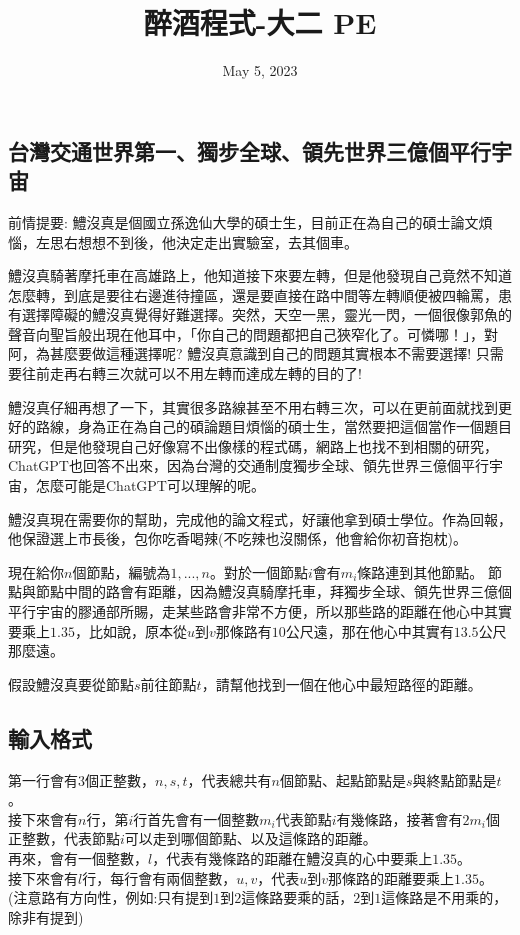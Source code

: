 \documentclass{article}
\title{醉酒程式-大二 PE}
\date{May 5, 2023}
\begin{document}
\begin{CJK*}{UTF8}{bsmi}

\maketitle

\section*{台灣交通世界第一、獨步全球、領先世界三億個平行宇宙}

前情提要: 鱧沒真是個國立孫逸仙大學的碩士生，目前正在為自己的碩士論文煩惱，左思右想想不到後，他決定走出實驗室，去其個車。

鱧沒真騎著摩托車在高雄路上，他知道接下來要左轉，但是他發現自己竟然不知道怎麼轉，到底是要往右邊進待撞區，還是要直接在路中間等左轉順便被四輪罵，患有選擇障礙的鱧沒真覺得好難選擇。突然，天空一黑，靈光一閃，一個很像郭魚的聲音向聖旨般出現在他耳中，「你自己的問題都把自己狹窄化了。可憐哪！」，對阿，為甚麼要做這種選擇呢? 鱧沒真意識到自己的問題其實根本不需要選擇! 只需要往前走再右轉三次就可以不用左轉而達成左轉的目的了!

鱧沒真仔細再想了一下，其實很多路線甚至不用右轉三次，可以在更前面就找到更好的路線，身為正在為自己的碩論題目煩惱的碩士生，當然要把這個當作一個題目研究，但是他發現自己好像寫不出像樣的程式碼，網路上也找不到相關的研究，ChatGPT也回答不出來，因為台灣的交通制度獨步全球、領先世界三億個平行宇宙，怎麼可能是ChatGPT可以理解的呢。

鱧沒真現在需要你的幫助，完成他的論文程式，好讓他拿到碩士學位。作為回報，他保證選上市長後，包你吃香喝辣(不吃辣也沒關係，他會給你初音抱枕)。

現在給你$n$個節點，編號為$1,...,n$。對於一個節點$i$會有$m_i$條路連到其他節點。
節點與節點中間的路會有距離，因為鱧沒真騎摩托車，拜獨步全球、領先世界三億個平行宇宙的膠通部所賜，走某些路會非常不方便，所以那些路的距離在他心中其實要乘上$1.35$，比如說，原本從$u$到$v$那條路有$10$公尺遠，那在他心中其實有$13.5$公尺那麼遠。

假設鱧沒真要從節點$s$前往節點$t$，請幫他找到一個在他心中最短路徑的距離。

\subsection*{輸入格式}
第一行會有$3$個正整數，$n,s,t$，代表總共有$n$個節點、起點節點是$s$與終點節點是$t$。\\
接下來會有$n$行，第$i$行首先會有一個整數$m_i$代表節點$i$有幾條路，接著會有$2m_i$個正整數，代表節點$i$可以走到哪個節點、以及這條路的距離。\\
再來，會有一個整數，$l$，代表有幾條路的距離在鱧沒真的心中要乘上$1.35$。\\
接下來會有$l$行，每行會有兩個整數，$u,v$，代表$u$到$v$那條路的距離要乘上$1.35$。(注意路有方向性，例如:只有提到$1$到$2$這條路要乘的話，$2$到$1$這條路是不用乘的，除非有提到)


\end{CJK*}
\end{document}
